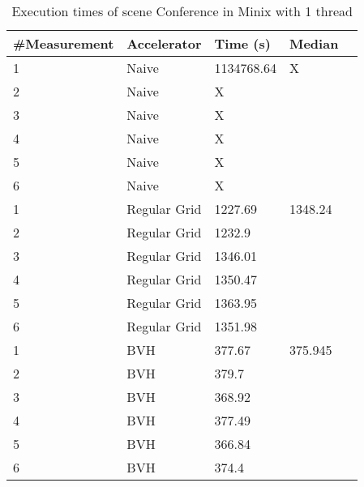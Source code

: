 \begin{table}[H]
	\small
	\begin{tabular}{|l|l|l|l|l|}
		\hline
		\#Measurement & Accelerator & Time (s) & Median \\ \hline
		1 & Naive & 1134768.64 & X \\ \hline
		2 & Naive & X & \\ \hline
		3 & Naive & X & \\ \hline
		4 & Naive & X & \\ \hline
		5 & Naive & X & \\ \hline
		6 & Naive & X & \\ \hline
		1 & Regular Grid & 1227.69 & 1348.24 \\ \hline
		2 & Regular Grid & 1232.9 & \\ \hline
		3 & Regular Grid & 1346.01 & \\ \hline
		4 & Regular Grid & 1350.47 & \\ \hline
		5 & Regular Grid & 1363.95 & \\ \hline
		6 & Regular Grid & 1351.98 & \\ \hline
		1 & BVH & 377.67 & 375.945 \\ \hline
		2 & BVH & 379.7 & \\ \hline
		3 & BVH & 368.92 & \\ \hline
		4 & BVH & 377.49 & \\ \hline
		5 & BVH & 366.84 & \\ \hline
		6 & BVH & 374.4 & \\ \hline
	\end{tabular}
	\label{Time}
	\caption{Execution times of scene Conference in Minix with 1 thread}
\end{table}

